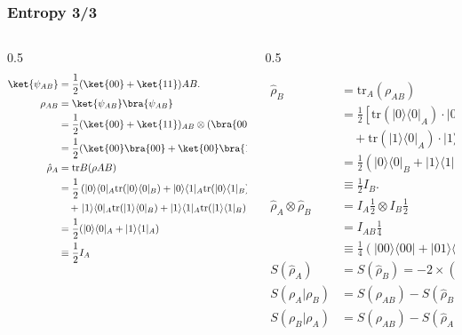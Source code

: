 \begin{frame}
    \frametitle{Entropy 3/3}
       \vspace*{-0.5cm}
  \begin{columns}[T]
  \tiny
    \begin{column}{0.5\textwidth}
\begin{align*}
\ket{\psi_{AB}} &= \frac{1}{2} (\ket{00} + \ket{11}){AB}. \\
\rho_{AB} &= \ket{\psi_{AB}}\bra{\psi_{AB}} \\
&= \frac{1}{2} (\ket{00} + \ket{11})_{AB} \otimes (\bra{00} + \bra{11}){AB}.\\
&= \frac{1}{2}(\ket{00}\bra{00}+\ket{00}\bra{11}+\ket{11}\bra{00}+\ket{11}\bra{11})\\
\hat{\rho}_A &= \text{tr}B (\rho{AB})\\
&= \frac{1}{2} \left( |0\rangle\langle 0|_A \text{tr} (|0\rangle\langle 0|_B) + |0\rangle\langle 1|_A \text{tr} (|0\rangle\langle 1|_B) \right. \\
& \quad + \left. |1\rangle\langle 0|_A \text{tr} (|1\rangle\langle 0|_B) + |1\rangle\langle 1|_A \text{tr} (|1\rangle\langle 1|_B) \right) \\
&= \frac{1}{2} (|0\rangle\langle 0|_A + |1\rangle\langle 1|_A) \\
&\equiv \frac{1}{2} I_A \\
\end{align*}
    \end{column}

   \begin{column}{0.5\textwidth}
   
\begin{align*}
\hat{\rho}_B &= \text{tr}_A(\rho_{AB}) \\
&= \frac{1}{2} \left[ \text{tr}(|0\rangle\langle 0|_A) \cdot |0\rangle\langle 0|_B + \text{tr}(|0\rangle\langle 1|_A) \cdot |0\rangle\langle 1|_B \right. \\
& \quad + \left. \text{tr}(|1\rangle\langle 0|_A) \cdot |1\rangle\langle 0|_B + \text{tr}(|1\rangle\langle 1|_A) \cdot |1\rangle\langle 1|_B \right] \\
&= \frac{1}{2} (|0\rangle\langle 0|_B + |1\rangle\langle 1|_B) \\
&\equiv \frac{1}{2} I_B.\\
\hat{\rho}_A \otimes \hat{\rho}_B &= I_A \frac{1}{2} \otimes I_B \frac{1}{2} \\
&= I_{AB} \frac{1}{4} \\
&\equiv \frac{1}{4} (|00\rangle\langle00| + |01\rangle\langle01| + |10\rangle\langle10| + |11\rangle\langle11|).\\
S(\hat{\rho}_A) &= S(\hat{\rho}_B) = -2 \times \left(\frac{1}{2}\right) \log\left(\frac{1}{2}\right) \equiv 1.\\
S(\rho_A | \rho_B) &= S(\rho_{AB}) - S(\hat{\rho}_B) = 0 - 1 \equiv -1 \\
S(\rho_B | \rho_A) &= S(\rho_{AB}) - S(\hat{\rho}_A) = 0 - 1 \equiv -1.
\end{align*}

    \end{column}
  \end{columns}  
\end{frame}
